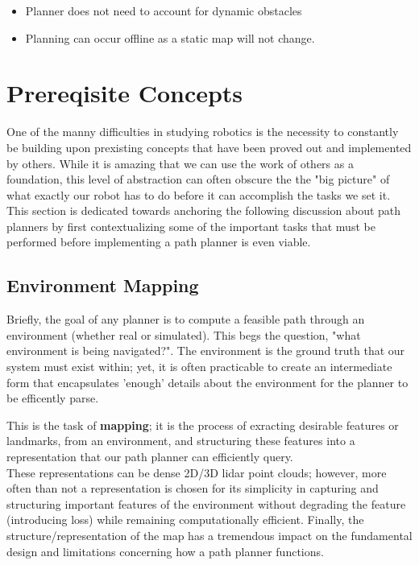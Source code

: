 \documentclass[journal]{IEEEtran}
\begin{document}
\begin{itemize}
  \item Planner does not need to account for dynamic obstacles
  \item Planning can occur offline as a static map will not change. 
\end{itemize}


\section{Prereqisite Concepts}

One of the manny difficulties in studying robotics is the necessity to constantly be building upon prexisting concepts that have been proved out and implemented by others. While it is amazing that we can use the work of others as a foundation, this level of abstraction can often obscure the the "big picture" of what exactly our robot has to do before it can accomplish the tasks we set it. \\

This section is dedicated towards anchoring the following discussion about path planners by first contextualizing some of the important tasks that must be performed before implementing a path planner is even viable.

\subsection{Environment Mapping}
Briefly, the goal of any planner is to compute a feasible path through an environment (whether real or simulated). This begs the question, "what environment is being navigated?".  The environment is the ground truth that our system must exist within; yet, it is often practicable to create an intermediate form that encapsulates 'enough' details about the environment for the planner to be efficently parse. 


This is the task of \textbf{mapping}; it is the process of exracting desirable features or landmarks, from an environment, and structuring these features into a representation that our path planner can efficiently query. \\

These representations can be dense 2D/3D lidar point clouds; however, more often than not a representation is chosen for its simplicity in capturing and structuring important features of the environment without degrading the feature (introducing loss) while remaining computationally efficient. Finally, the structure/representation of the map has a tremendous impact on the fundamental design and limitations concerning how a path planner functions.  \\
\end{document}
